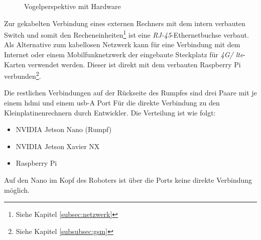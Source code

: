 \begin{figure}[h]
    \caption{Vogelperspektive mit Hardware}\label{fig:vogelperspektive}
\end{figure}

Zur gekabelten Verbindung eines externen Rechners mit dem intern verbauten Switch und somit den Recheneinheiten\footnote{Siehe Kapitel \ref{subsec:netzwerk}}
ist eine \emph{RJ-45}-Ethernetbuchse  verbaut.
Als Alternative zum kabellosen Netzwerk kann für eine Verbindung mit dem Internet oder einem Mobilfunknetzwerk der eingebaute
Steckplatz für \emph{4G/ \gls{lte}}-Karten  verwendet werden.
Dieser ist direkt mit dem verbauten Raspberry Pi verbunden\footnote{Siehe Kapitel \ref{subsubsec:gsm}}.

Die restlichen Verbindungen auf der Rückseite des Rumpfes sind drei Paare mit je einem \gls{hdmi} und einem \gls{usb}-A Port
Für die direkte Verbindung zu den Kleinplatinenrechnern durch Entwickler.
Die Verteilung ist wie folgt:

\begin{itemize}
    \item {} NVIDIA Jetson Nano (Rumpf)
    \item {} NVIDIA Jetson Xavier NX
    \item {} Raspberry Pi
\end{itemize}

\noindent Auf den Nano im Kopf des Roboters ist über die Ports keine direkte Verbindung möglich.




